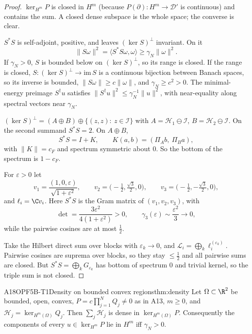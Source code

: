 \begin{proof}
$\ker_{H^m}P$ is closed in $H^m$ (because $P(\partial):H^m\to\mathcal D'$ is continuous) and contains the sum. A closed dense subspace is the whole space; the converse is clear.

$S^*S$ is self-adjoint, positive, and leaves $(\ker S)^\perp$ invariant. On it
\[
\|S\omega\|^2=\langle S^*S\omega,\omega\rangle\ge\gamma_N\|\omega\|^2 .
\]
If $\gamma_N>0$, $S$ is bounded below on $(\ker S)^\perp$, so its range is closed. If the range is closed, $S:(\ker S)^\perp\to\mathrm{im}\,S$ is a continuous bijection between Banach spaces, so its inverse is bounded, $\|S\omega\|\ge c\|\omega\|$, and $\gamma_N\ge c^2>0$. The minimal-energy preimage $S^\dagger u$ satisfies $\|S^\dagger u\|^2\le\gamma_N^{-1}\|u\|^2$, with near-equality along spectral vectors near $\gamma_N$.

$(\ker S)^\perp=(A\oplus B)\oplus\{(z,z):\ z\in\mathcal I\}$ with $A=\mathcal H_1\ominus\mathcal I$, $B=\mathcal H_2\ominus\mathcal I$. On the second summand $S^*S=2$. On $A\oplus B$,
\[
S^*S=I+K,\qquad K(a,b)=(\Pi_Ab,\ \Pi_Ba),
\]
with $\|K\|=c_F$ and spectrum symmetric about $0$. So the bottom of the spectrum is $1-c_F$.

For $\varepsilon>0$ let
\[
v_1=\frac{(1,0,\varepsilon)}{\sqrt{1+\varepsilon^2}},\qquad v_2=\Big(-\tfrac12,\tfrac{\sqrt3}{2},0\Big),\qquad v_3=\Big(-\tfrac12,-\tfrac{\sqrt3}{2},0\Big),
\]
and $\ell_i=\C v_i$. Here $S^*S$ is the Gram matrix of $(v_1,v_2,v_3)$, with
\[
\det=\frac{3\varepsilon^2}{4(1+\varepsilon^2)}>0,\qquad \gamma_3(\varepsilon)\sim\frac{\varepsilon^2}{3}\to0,
\]
while the pairwise cosines are at most $\tfrac12$.

Take the Hilbert direct sum over blocks with $\varepsilon_k\to0$, and $\mathcal L_i=\bigoplus_k\ell_i^{(\varepsilon_k)}$. Pairwise cosines are suprema over blocks, so they stay $\le\tfrac12$ and all pairwise sums are closed. But $S^*S=\bigoplus_kG_{\varepsilon_k}$ has bottom of spectrum $0$ and trivial kernel, so the triple sum is not closed.

\end{proof}

\begin{dimcard}{A18}{OPF5B-T1}{Density on bounded convex regions}{}{thm:density}
Let $\Omega\subset\R^2$ be bounded, open, convex, $P=c\prod_{j=1}^NQ_j\ne0$ as in A13, $m\ge0$, and $\mathcal H_j=\ker_{H^m(\Omega)}Q_j$. Then $\sum_j\mathcal H_j$ is dense in $\ker_{H^m(\Omega)}P$. Consequently the components of every $u\in\ker_{H^m}P$ lie in $H^m$ iff $\gamma_N>0$.
\end{dimcard}

